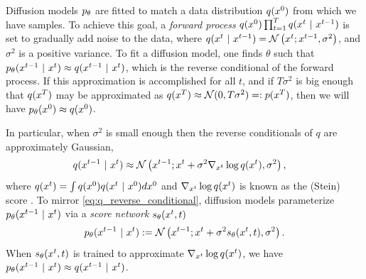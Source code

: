 Diffusion models $p_{\theta}$ are fitted to match a data distribution $q (x^{0})$ from which we have samples.
To achieve this goal, a \emph{forward process} $q(x^{0}) \prod_{t=1}^{T} q(x^{t}~\vert~ x^{t-1})$ is set to gradually add noise to the data, where $q(x^{t} ~\vert~ x^{t-1}) = \mathcal{N} \left ( x^{t}; x^{t-1} ,  \sigma^2\right)$, and $\sigma^2$ is a positive variance.
To fit a diffusion model, one finds $\theta$ such that $p_\theta(x^{t-1} ~\vert~ x^{t}) \approx q(x^{t-1}~\vert~ x^{t})$, which is the reverse conditional of the forward process.
If this approximation is accomplished for all $t$, and if $T\sigma^2$ is big enough that $q(x^{T})$ may be approximated as $q(x^{T})\approx \mathcal{N}(0, T\sigma^2)=: p(x^{T})$, then we will have $p_{\theta}(x^{0}) \approx q(x^{0})$.

In particular, when $\sigma^2$ is small enough 
then the reverse conditionals of $q$ are approximately Gaussian,
\begin{align}\label{eq:q_reverse_conditional}
\begin{split}
q(x^{t-1} ~\vert~ x^{t}) 
    &\approx \mathcal{N}\left(x^{t-1}; x^{t} + \sigma^2\nabla_{x^{t}} \log q(x^{t}), \sigma^2 \right),
\end{split}
\end{align}
where $q(x^{t})=\int q(x^{0}) q(x^{t} ~\vert~ x^{0}) dx^{0}$ and $\nabla_{x^{t}} \log q(x^{t})$ is known as the (Stein) score \citep{song2020score}.
To mirror \cref{eq:q_reverse_conditional}, diffusion models parameterize $p_{\theta}(x^{t-1} ~\vert~ x^{t})$ via a \emph{score network} $s_\theta(x^{t}, t)$
\begin{align}\label{eq:unconditional-diffusion-transition}
    p_{\theta}(x^{t-1} ~\vert~ x^{t}) := \mathcal{N}\left(
    x^{t-1};x^{t}   +  \sigma^2 s_\theta(x^{t}, t),\sigma^2 \right). 
\end{align}
When $s_\theta (x^{t}, t)$ is trained to approximate $ \nabla_{x^{t}} \log q(x^{t} )$, we have $p_{\theta}(x^{t-1} ~\vert~ x^{t}) \approx q(x^{t-1} ~\vert~ x^{t})$. 


